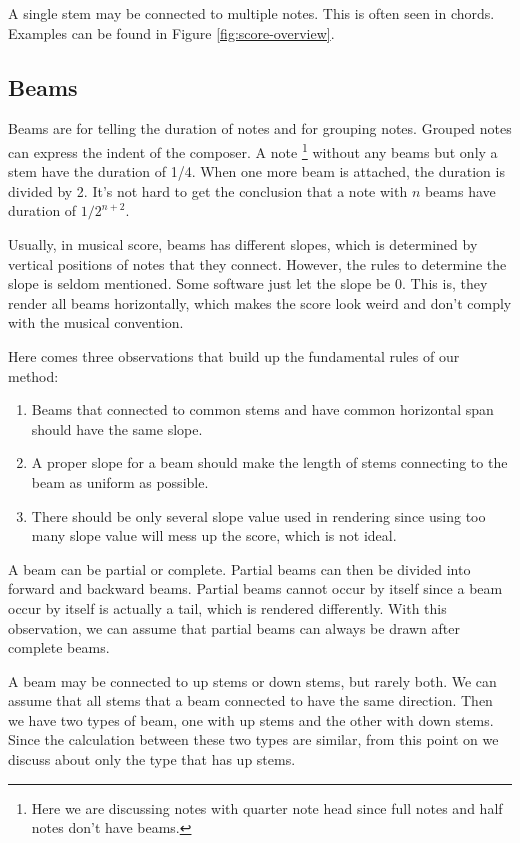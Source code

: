 A single stem may be connected to multiple notes. This is often seen in chords. Examples can be found in Figure \ref{fig:score-overview}.

\subsection{Beams}
Beams are for telling the duration of notes and for grouping notes. Grouped notes can express the indent of the composer. A note \footnote{Here we are discussing notes with quarter note head since full notes and half notes don't have beams. } without any beams but only a stem have the duration of 1/4. When one more beam is attached, the duration is divided by 2. It's not hard to get the conclusion that a note with $n$ beams have duration of $1 / 2^{n+2}$.

Usually, in musical score, beams has different slopes, which is determined by vertical positions of notes that they connect. However, the rules to determine the slope is seldom mentioned. Some software just let the slope be 0. This is, they render all beams horizontally, which makes the score look weird and don't comply with the musical convention. 

Here comes three observations that build up the fundamental rules of our method:
\begin{enumerate}
    \item 
        Beams that connected to common stems and have common horizontal span should have the same slope.
    \item
        A proper slope for a beam should make the length of stems connecting to the beam as uniform as possible. 
    \item 
        There should be only several slope value used in rendering since using too many slope value will mess up the score, which is not ideal.
\end{enumerate}


A beam can be partial or complete. Partial beams can then be divided into forward and backward beams. Partial beams cannot occur by itself since a beam occur by itself is actually a tail, which is rendered differently. With this observation, we can assume that partial beams can always be drawn after complete beams.

A beam may be connected to up stems or down stems, but rarely both. We can assume that all stems that a beam connected to have the same direction. Then we have two types of beam, one with up stems and the other with down stems. Since the calculation between these two types are similar, from this point on we discuss about only the type that has up stems.

